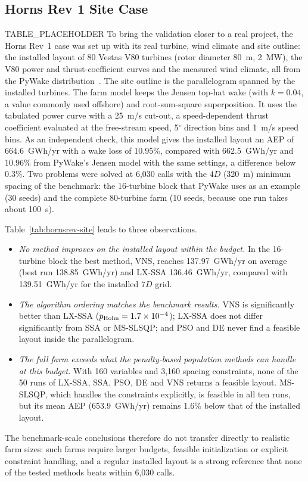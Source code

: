 \subsection{Horns Rev 1 Site Case}
\label{sec:hornsrev-site}
TABLE_PLACEHOLDER
To bring the validation closer to a real project, the Horns Rev~1 case was set up with its real turbine, wind climate and site outline: the installed layout of 80 Vestas V80 turbines (rotor diameter 80~m, 2~MW), the V80 power and thrust-coefficient curves and the measured wind climate, all from the PyWake distribution~\cite{PyWake}. The site outline is the parallelogram spanned by the installed turbines. The farm model keeps the Jensen top-hat wake (with $k=0.04$, a value commonly used offshore) and root-sum-square superposition. It uses the tabulated power curve with a 25~m/s cut-out, a speed-dependent thrust coefficient evaluated at the free-stream speed, 5$^\circ$ direction bins and 1~m/s speed bins. As an independent check, this model gives the installed layout an AEP of 664.6~GWh/yr with a wake loss of 10.95\%, compared with 662.5~GWh/yr and 10.96\% from PyWake's Jensen model with the same settings, a difference below 0.3\%. Two problems were solved at 6,030 calls with the $4D$ (320~m) minimum spacing of the benchmark: the 16-turbine block that PyWake uses as an example (30 seeds) and the complete 80-turbine farm (10 seeds, because one run takes about 100~s).

Table~\ref{tab:hornsrev-site} leads to three observations.
\begin{itemize}
\item \emph{No method improves on the installed layout within the budget.} In the 16-turbine block the best method, VNS, reaches 137.97~GWh/yr on average (best run 138.85~GWh/yr) and LX-SSA 136.46~GWh/yr, compared with 139.51~GWh/yr for the installed $7D$ grid.
\item \emph{The algorithm ordering matches the benchmark results.} VNS is significantly better than LX-SSA ($p_{\rm Holm}=1.7\times10^{-4}$); LX-SSA does not differ significantly from SSA or MS-SLSQP; and PSO and DE never find a feasible layout inside the parallelogram.
\item \emph{The full farm exceeds what the penalty-based population methods can handle at this budget.} With 160 variables and 3,160 spacing constraints, none of the 50 runs of LX-SSA, SSA, PSO, DE and VNS returns a feasible layout. MS-SLSQP, which handles the constraints explicitly, is feasible in all ten runs, but its mean AEP (653.9~GWh/yr) remains 1.6\% below that of the installed layout.
\end{itemize}
The benchmark-scale conclusions therefore do not transfer directly to realistic farm sizes: such farms require larger budgets, feasible initialization or explicit constraint handling, and a regular installed layout is a strong reference that none of the tested methods beats within 6,030 calls.

